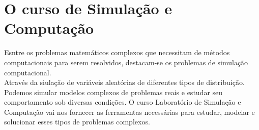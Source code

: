\documentclass[a4paper,12pt]{article}
\begin{document}
	\section{O curso de Simulação e Computação}
		Esntre os problemas matemáticos complexos que necessitam de métodos computacionais para serem resolvidos, destacam-se os problemas de simulação computacional.\\
		
		Através da siulação de variáveis aleatórias de diferentes tipos de distribuição. Podemos simular modelos complexos de problemas reais e estudar seu comportamento sob diversas condições. O curso Laboratório de Simulação e Computação vai nos fornecer as ferramentas necessárias para estudar, modelar e solucionar esses tipos de problemas complexos.
		

\end{document}
